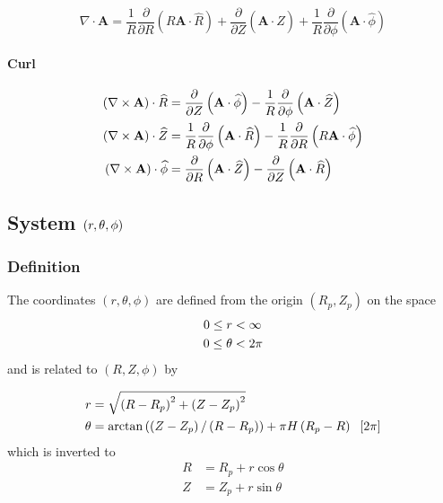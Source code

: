 \begin{equation}
\nabla\cdot\mathbf{A}=\frac{1}{R}\frac{\partial}{\partial R}\left( R\mathbf{A%
} \cdot\widehat{R}\right) +\frac{\partial}{\partial Z}\left( \mathbf{A}\cdot%
\widehat{Z}\right) +\frac{1}{R}\frac{\partial}{\partial\phi }\left( \mathbf{A%
} \cdot\widehat{\phi}\right)
\end{equation}

\paragraph{Curl}

\begin{align}
\left( \nabla\times\mathbf{A}\right) \cdot\widehat{R} & =\frac{\partial}{
\partial Z}\left( \mathbf{A}\cdot\widehat{\phi}\right) -\frac{1}{R}\frac{
\partial}{\partial\phi}\left( \mathbf{A}\cdot\widehat{Z}\right) \\
\left( \nabla\times\mathbf{A}\right) \cdot\widehat{Z} & =\frac{1}{R}\frac{
\partial}{\partial\phi}\left( \mathbf{A}\cdot\widehat{R}\right) -\frac{1}{R}%
\frac{\partial}{\partial R}\left( R\mathbf{A}\cdot\widehat{\phi}\right) \\
\left( \nabla\times\mathbf{A}\right) \cdot\widehat{\phi} & =\frac {\partial}{%
\partial R}\left( \mathbf{A}\cdot\widehat{Z}\right) -\frac{\partial}{
\partial Z}\left( \mathbf{A}\cdot\widehat{R}\right)
\end{align}

\subsection{System $\left( r,\protect\theta,\protect\phi\right) $}

\subsubsection{Definition}

The coordinates $\left( r,\theta,\phi\right) $ are defined from the origin $%
\left( R_{p},Z_{p}\right) $ on the space 
\begin{align}
0\leq r & <\infty \\
0\leq\theta & <2\pi  \notag
\end{align}
and is related to $\left( R,Z,\phi\right) $ by

\begin{align}
r& =\sqrt{\left( R-R_{p}\right) ^{2}+\left( Z-Z_{p}\right) ^{2}}
\label{rthetadef} \\
\theta & =\arctan \left( \left( Z-Z_{p}\right) /\left( R-R_{p}\right)
\right) +\pi H\left( R_{p}-R\right) \;\ \left[ 2\pi \right]  \notag
\end{align}%
which is inverted to 
\begin{align}
R& =R_{p}+r\cos \theta  \label{Rdef} \\
Z& =Z_{p}+r\sin \theta  \label{Zdef}
\end{align}

